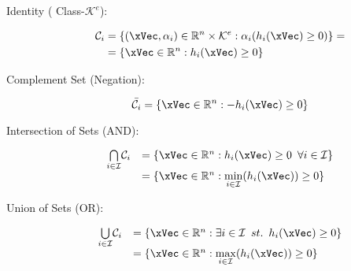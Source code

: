 \begin{description}

    \item[Identity ( Class-\(\mathcal{K}^e\)):] 
    \begin{subequations}
        \begin{align}
            \mathcal{C}_i &= \{(\xVec, \alpha_i) \in \mathbb{R}^n \times \mathcal{K}^e: \alpha_i(h_i(\xVec) \geq 0)\} = 
            \label{eq:Indentity_set} \\
                          &= \{\xVec \in \mathbb{R}^n: h_i(\xVec) \geq 0\}
            \label{eq:Gen_Safe_set} 
        \end{align}
    \end{subequations}

    \item[Complement Set (Negation):] 
    
    \begin{equation}
        \bar{\mathcal{C}_i} = \{\xVec \in \mathbb{R}^n: -h_i(\xVec) \geq 0\} 
        \label{eq:Negation_set} 
    \end{equation}

    \item[Intersection of Sets (AND):] 

        \begin{equation}
            \begin{array}{rl}      
            \underset{i \in \mathcal{I}}{\bigcap} \mathcal{C}_i &= \{\xVec \in \mathbb{R}^n: h_i(\xVec) \geq 0 \hspace{0.5em} \forall i \in \mathcal{I}\}  \\
                                                      &= \{\xVec \in \mathbb{R}^n: \underset{i \in \mathcal{I}}{\min}(h_i(\xVec)) \geq 0 \} 
            \end{array}
            \label{eq:Intersection_set}
        \end{equation}

    \item[Union of Sets (OR):] 
    
        \begin{equation}
            \begin{array}{rl}
                \underset{i \in \mathcal{I}}{\bigcup} \mathcal{C}_i &= \{\xVec \in \mathbb{R}^n: \exists i \in \mathcal{I} \hspace{0.5em} st. \hspace{0.5em} h_i(\xVec) \geq 0 \}  \\
                                                          &= \{\xVec \in \mathbb{R}^n: \underset{i \in \mathcal{I}}{\max}(h_i(\xVec)) \geq 0 \} 
            \end{array}
            \label{eq:Union_set}
        \end{equation}
\end{description}

